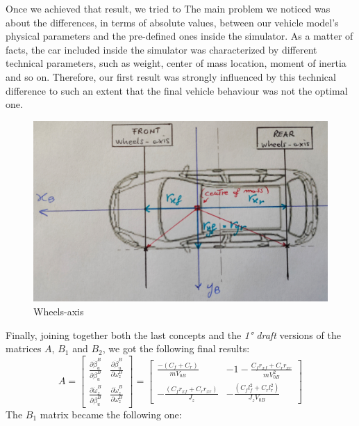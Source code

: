 	Once we achieved that result, we tried to 
	The main problem we noticed was about the differences, in terms of absolute values, between our vehicle model's physical parameters and the pre-defined ones inside the simulator. As a matter of facts, the car included inside the simulator was characterized by different technical parameters, such as weight, center of mass location, moment of inertia and so on. Therefore, our first result was strongly influenced by this technical difference to such an extent that the final vehicle behaviour was not the optimal one.
\begin{figure}[b] \label{VehicleScheme}
	\centering
	\includegraphics[scale=0.065]{../Images/LinSyst/SchemaAssi}
	\caption{Wheels-axis}
\end{figure}
Finally, joining together both the last concepts and the \textit{1° draft} versions of the matrices $A$, $B_{1}$ and $B_{2}$, we got the following final results:
\begin{equation}
	A=
	\begin{bmatrix}
		\frac{\partial\dot{\beta}_{u}^{B}}{\partial\beta_{u}^{B}} & \frac{\partial\dot{\beta}_{u}^{B}}{\partial\omega_{z}^{B}} \\
		\frac{\partial\dot{\omega}_{z}^{B}}{\partial\beta_{u}^{B}} & \frac{\partial\dot{\omega}_{z}^{B}}{\partial\omega_{z}^{B}}
	\end{bmatrix} = 
	\begin{bmatrix}
		\frac{-(C_{f} + C_{r})}{mV_{0B}} & -1 -\frac{C_{f}r_{xf} + C_{r}r_{xr}}{m V_{0B}^{2}} \\ 
		-\frac{(C_{f}r_{xf} + C_{r}r_{xr})}{J_{z}} & -\frac{(C_{f}l_{f}^{2} + C_{r}l_{r}^{2})}{J_{z} V_{0B}}
	\end{bmatrix}
\end{equation}
The $B_{1}$ matrix became the following one:
